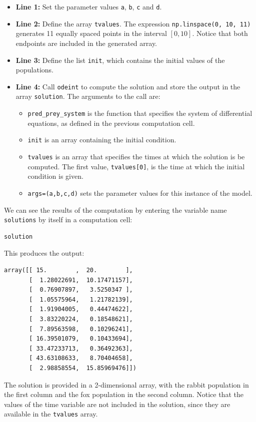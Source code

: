 \begin{itemize}
\item \textbf{Line 1:} Set the parameter values \texttt{a}, \texttt{b}, \texttt{c} and \texttt{d}. 
\item \textbf{Line 2:} Define the array \texttt{tvalues}. The expression \texttt{np.linspace(0, 10, 11)} generates 11 equally spaced points in the interval $[0,10]$. Notice that both endpoints are included in the generated array.
\item \textbf{Line 3:} Define the list \texttt{init}, which contains the initial values of the populations.
\item \textbf{Line 4:} Call \texttt{odeint} to compute the solution and store the output in the array \texttt{solution}. The arguments to the call are:
	\begin{itemize}
	\item \texttt{pred\_prey\_system} is the function that specifies the system of differential equations, as defined in the previous computation cell.
	\item \texttt{init} is an array containing the initial condition.
	\item \texttt{tvalues} is an array that specifies the times at which the solution is be computed. The first value, \texttt{tvalues[0]}, is the time at which the initial condition is given.
	\item  \texttt{args=(a,b,c,d)} sets the parameter values for this instance of the model.
	\end{itemize}
\end{itemize}
We can see the results of the computation by entering the variable name \texttt{solutions} by itself in a computation cell:
\begin{lstlisting}
solution
\end{lstlisting}
This produces the output:
\begin{lstlisting}
array([[ 15.        ,  20.        ],
       [  1.28022691,  10.17471157],
       [  0.76907897,   3.5250347 ],
       [  1.05575964,   1.21782139],
       [  1.91904005,   0.44474622],
       [  3.83220224,   0.18548621],
       [  7.89563598,   0.10296241],
       [ 16.39501079,   0.10433694],
       [ 33.47233713,   0.36492363],
       [ 43.63108633,   8.70404658],
       [  2.98858554,  15.85969476]])
\end{lstlisting}
The solution is provided in a 2-dimensional array, with the rabbit population in the first column and the fox population in the second column. Notice that the values of the time variable are not included in the solution, since they are available in the \texttt{tvalues} array.

